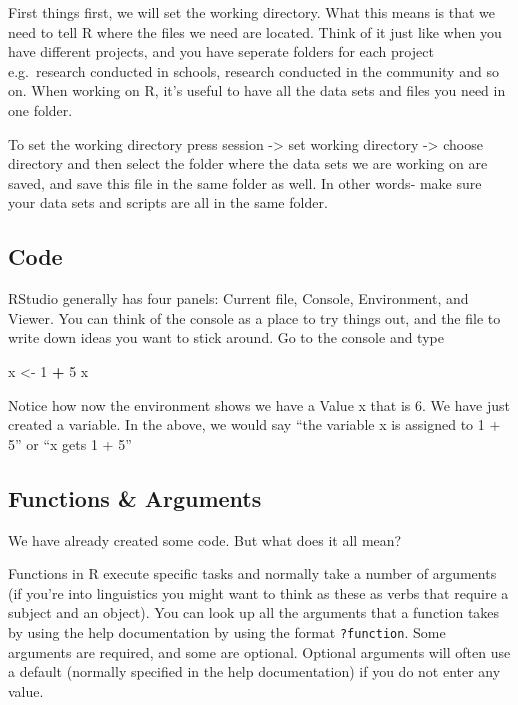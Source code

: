 \documentclass[]{book}
\newenvironment{Shaded}{\begin{snugshade}}{\end{snugshade}}
\newcommand{\DecValTok}[1]{\textcolor[rgb]{0.00,0.00,0.81}{#1}}
\newcommand{\StringTok}[1]{\textcolor[rgb]{0.31,0.60,0.02}{#1}}
\newcommand{\OperatorTok}[1]{\textcolor[rgb]{0.81,0.36,0.00}{\textbf{#1}}}
\newcommand{\NormalTok}[1]{#1}
\begin{document}
First things first, we will set the working directory. What this means
is that we need to tell R where the files we need are located. Think of
it just like when you have different projects, and you have seperate
folders for each project e.g.~research conducted in schools, research
conducted in the community and so on. When working on R, it's useful to
have all the data sets and files you need in one folder.

To set the working directory press session -\textgreater{} set working
directory -\textgreater{} choose directory and then select the folder
where the data sets we are working on are saved, and save this file in
the same folder as well. In other words- make sure your data sets and
scripts are all in the same folder.

\subsection{Code}\label{code}

RStudio generally has four panels: Current file, Console, Environment,
and Viewer. You can think of the console as a place to try things out,
and the file to write down ideas you want to stick around. Go to the
console and type

\begin{Shaded}
\begin{Highlighting}[]
\NormalTok{x <-}\StringTok{ }\DecValTok{1} \OperatorTok{+}\StringTok{ }\DecValTok{5}
\NormalTok{x}
\end{Highlighting}
\end{Shaded}

Notice how now the environment shows we have a Value x that is 6. We
have just created a variable. In the above, we would say ``the variable
x is assigned to 1 + 5'' or ``x gets 1 + 5''

\subsection{Functions \& Arguments}\label{functions-arguments}

We have already created some code. But what does it all mean?

Functions in R execute specific tasks and normally take a number of
arguments (if you're into linguistics you might want to think as these
as verbs that require a subject and an object). You can look up all the
arguments that a function takes by using the help documentation by using
the format \texttt{?function}. Some arguments are required, and some are
optional. Optional arguments will often use a default (normally
specified in the help documentation) if you do not enter any value.
\end{document}
